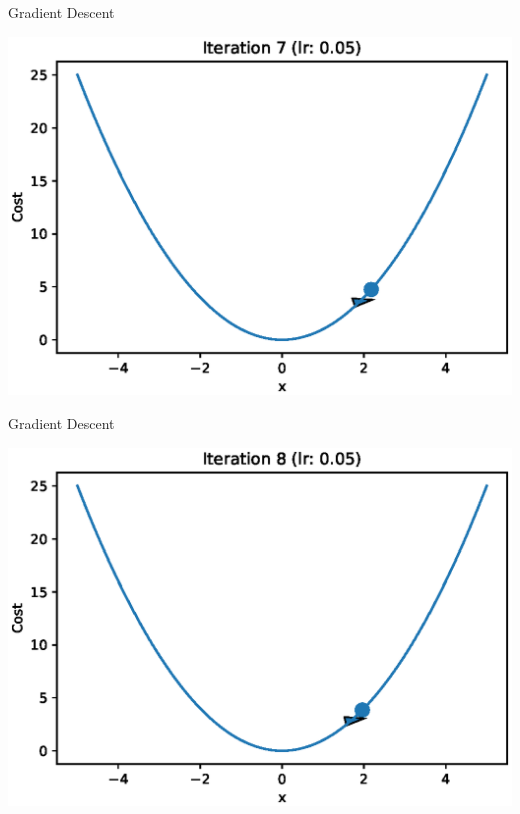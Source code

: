 \documentclass{beamer}
\begin{document}
	\begin{frame}{Gradient Descent}
		\begin{center}
			\includegraphics[totalheight=6cm]{gradient-descent/iteration-7.eps}
		\end{center}
	\end{frame}
	
	\begin{frame}{Gradient Descent}
		\begin{center}
			\includegraphics[totalheight=6cm]{gradient-descent/iteration-8.eps}
		\end{center}
	\end{frame}
	
\end{document}
